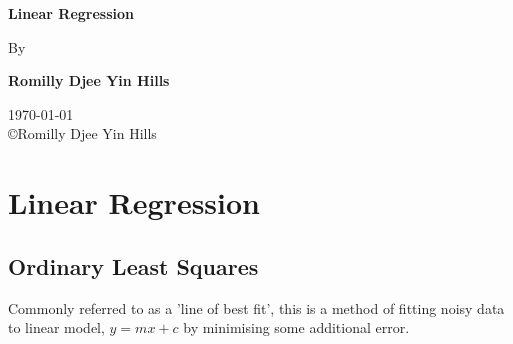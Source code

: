 \documentclass[12pt,a4paper]{report}
\begin{document}
\begin{titlepage}
	\begin{center}
		\large
		\vspace*{1cm}
        		
 		\textbf{Linear Regression}
        
		\vspace{0.5cm}
		By
        
		\vspace{1.5cm}
        
		\textbf{Romilly Djee Yin Hills}\\

		\vspace{1.5cm}

		\today \\
		\copyright Romilly Djee Yin Hills\\
        
	\end{center}
\end{titlepage}


\chapter{Linear Regression}
	\section{Ordinary Least Squares}
		Commonly referred to as a 'line of best fit', this is a method of fitting noisy data to linear model, $y=mx+c$ by minimising some additional error.

\end{document}
